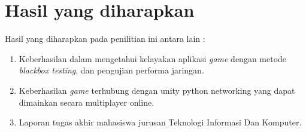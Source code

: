 \section{Hasil yang diharapkan}
Hasil yang diharapkan pada penilitian ini antara lain :
\begin{enumerate}
    \item Keberhasilan dalam mengetahui kelayakan aplikasi \textit{game} dengan metode \textit{blackbox testing}, dan pengujian performa jaringan.
    \item Keberhasilan \textit{game} terhubung dengan unity python networking yang dapat dimainkan secara multiplayer online.
    \item Laporan tugas akhir mahasiswa jurusan Teknologi Informasi Dan Komputer.
\end{enumerate}